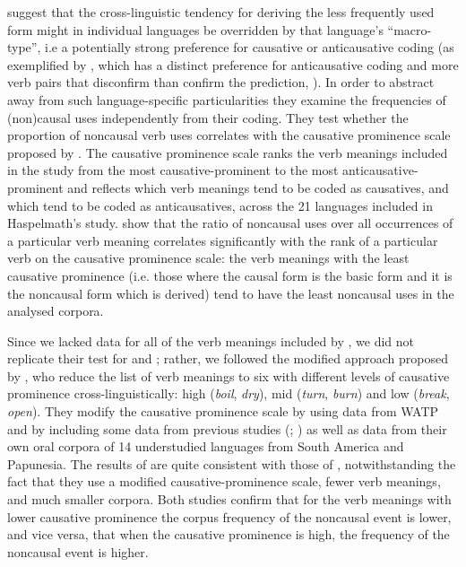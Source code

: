 \documentclass[output=paper,colorlinks,citecolor=brown]{langscibook}
\begin{document}
\begin{sloppypar}
\citet{Haspelmathetal2014} suggest that the cross-linguistic tendency for deriving the less frequently used form might in individual languages be overridden by that language’s ``macro-type'', i.e a potentially strong preference for causative or anticausative coding (as exemplified by , which has a distinct preference for anticausative coding and more verb pairs that disconfirm than confirm the prediction, \citealt[599]{Haspelmathetal2014}). In order to abstract away from such language-specific particularities they examine the frequencies of (non)causal uses independently from their coding. They test whether the proportion of noncausal verb uses correlates with the causative prominence scale proposed by \citet{Haspelmath1993}. The causative prominence scale ranks the verb meanings included in the study from the most causative-prominent to the most an\-ti\-caus\-a\-tive-prom\-i\-nent and reflects which verb meanings tend to be coded as causatives, and which tend to be coded as anticausatives, across the 21 languages included in Haspelmath’s study. \citet{Haspelmathetal2014} show that the ratio of noncausal uses over all occurrences of a particular verb meaning correlates significantly with the rank of a particular verb on the causative prominence scale: the verb meanings with the least causative prominence (i.e. those where the causal form is the basic form and it is the noncausal form which is derived) tend to have the least noncausal uses in the analysed corpora.
\end{sloppypar}

Since we lacked data for all of the verb meanings included by \citet{Haspelmathetal2014}, we did not replicate their test for  and ; rather, we followed the modified approach proposed by \citet{Seifart2019}, who reduce the list of verb meanings to six with different levels of causative prominence cross-linguistically: high (\textit{boil}, \textit{dry}), mid (\textit{turn}, \textit{burn}) and low (\textit{break}, \textit{open}). They modify the causative prominence scale by using data from WATP and by including some data from previous studies (\citealt{Haspelmath1993}; \citealt{Nichols2004}) as well as data from their own oral corpora of 14 understudied languages from South America and Papunesia. The results of \citet{Seifart2019} are quite consistent with those of \citet{Haspelmathetal2014}, notwithstanding the fact that they use a modified causative-prominence scale, fewer verb meanings, and much smaller corpora. Both studies confirm that for the verb meanings with lower causative prominence the corpus frequency of the noncausal event is lower, and vice versa, that when the causative prominence is high, the frequency of the noncausal event is higher.
\end{document}
